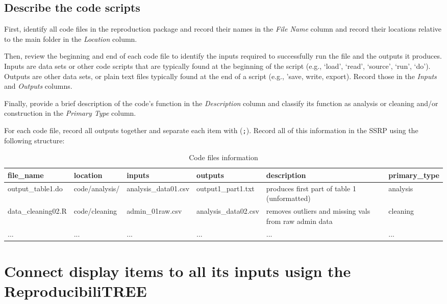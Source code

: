 \documentclass[
]{book}
\begin{document}
\hypertarget{desc-scripts}{%
\subsection{Describe the code scripts}\label{desc-scripts}}

First, identify all code files in the reproduction package and record their names in the \emph{File Name} column and record their locations relative to the main folder in the \emph{Location} column.

Then, review the beginning and end of each code file to identify the inputs required to successfully run the file and the outputs it produces. Inputs are data sets or other code scripts that are typically found at the beginning of the script (e.g., `load', `read', `source', `run', `do'). Outputs are other data sets, or plain text files typically found at the end of a script (e.g., 'save, write, export). Record those in the \emph{Inputs} and \emph{Outputs} columns.

Finally, provide a brief description of the code's function in the \emph{Description} column and classify its function as analysis or cleaning and/or construction in the \emph{Primary Type} column.

For each code file, record all outputs together and separate each item with (\texttt{;}). Record all of this information in the SSRP using the following structure:

\begin{table}

\caption{\label{tab:code-files-information}Code files information}
\centering
\begin{tabu} to 
\hline
file\_name & location & inputs & outputs & description & primary\_type\\
\hline
output\_table1.do & code/analysis/ & analysis\_data01.csv & output1\_part1.txt & produces first part of table 1 (unformatted) & analysis\\
\hline
data\_cleaning02.R & code/cleaning & admin\_01raw.csv & analysis\_data02.csv & removes outliers and missing vals from raw admin data & cleaning\\
\hline
... & ... & ... & ... & ... & ...\\
\hline
\end{tabu}
\end{table}

\hypertarget{diagram}{%
\section{Connect display items to all its inputs usign the ReproducibiliTREE}\label{diagram}}
\end{document}
